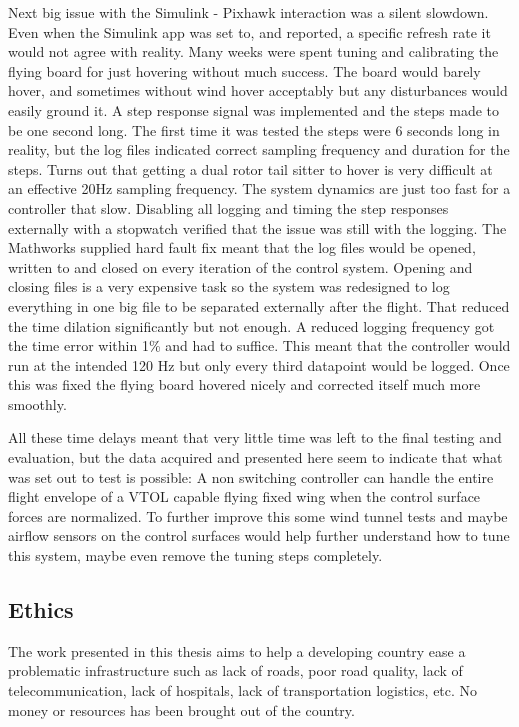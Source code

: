 \documentclass{article}
\begin{document}
Next big issue with the Simulink - Pixhawk interaction was a silent slowdown.
Even when the Simulink app was set to, and reported, a specific refresh rate it would not agree with reality.
Many weeks were spent tuning and calibrating the flying board for just hovering without much success. 
The board would barely hover, and sometimes without wind hover acceptably but any disturbances would easily ground it. 
A step response signal was implemented and the steps made to be one second long.
The first time it was tested the steps were 6 seconds long in reality, but the log files indicated correct sampling frequency and duration for the steps.
Turns out that getting a dual rotor tail sitter to hover is very difficult at an effective 20Hz sampling frequency.
The system dynamics are just too fast for a controller that slow.
Disabling all logging and timing the step responses externally with a stopwatch verified that the issue was still with the logging.
The Mathworks supplied hard fault fix meant that the log files would be opened, written to and closed on every iteration of the control system.
Opening and closing files is a very expensive task so the system was redesigned to log everything in one big file to be separated externally after the flight.
That reduced the time dilation significantly but not enough.
A reduced logging frequency got the time error within 1\% and had to suffice.
This meant that the controller would run at the intended 120 Hz but only every third datapoint would be logged.
Once this was fixed the flying board hovered nicely and corrected itself much more smoothly.

All these time delays meant that very little time was left to the final testing and evaluation, but the data acquired and presented here seem to indicate that what was set out to test is possible:
A non switching controller can handle the entire flight envelope of a VTOL capable flying fixed wing when the control surface forces are normalized.
To further improve this some wind tunnel tests and maybe airflow sensors on the control surfaces would help further understand how to tune this system, maybe even remove the tuning steps completely.

\subsection{Ethics}
The work presented in this thesis aims to help a developing country ease a problematic infrastructure such as lack of roads, poor road quality, lack of telecommunication, lack of hospitals, lack of transportation logistics, etc.
No money or resources has been brought out of the country.
\end{document}
